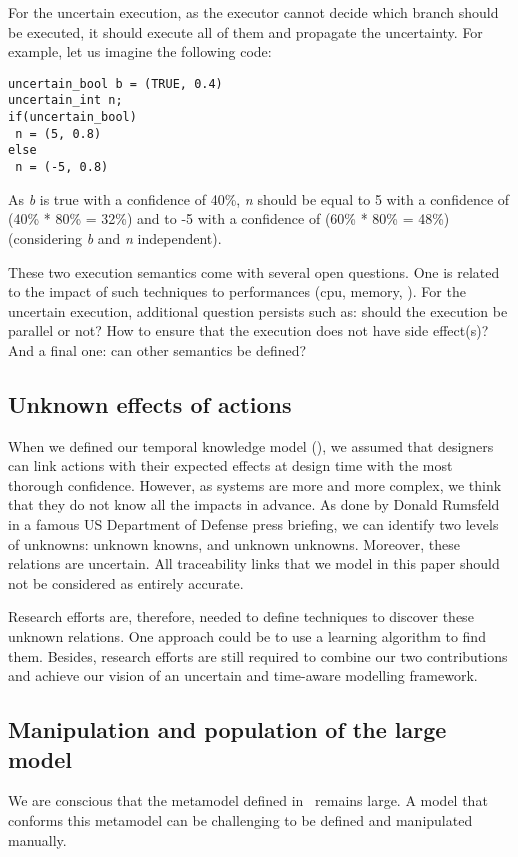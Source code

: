For the uncertain execution, as the executor cannot decide which branch should be executed, it should execute all of them and propagate the uncertainty.
For example, let us imagine the following code:

\begin{lstlisting}[style=javaStyle, caption=Example for uncertain control flow, label=lst:ucf-bool-example]
uncertain_bool b = (TRUE, 0.4)
uncertain_int n;
if(uncertain_bool)
 n = (5, 0.8)
else
 n = (-5, 0.8)
\end{lstlisting}
As \textit{b} is true with a confidence of 40\%, \textit{n} should be equal to 5 with a confidence of (40\% * 80\% = 32\%) and to -5 with a confidence of (60\% * 80\% = 48\%) (considering \textit{b} and \textit{n} independent).

These two execution semantics come with several open questions.
One is related to the impact of such techniques to performances (\gls{cpu}, memory, \etc).
For the uncertain execution, additional question persists such as: should the execution be parallel or not? How to ensure that the execution does not have side effect(s)?
And a final one: can other semantics be defined?

\subsection{Unknown effects of actions}
When we defined our temporal knowledge model (\cf {}), we assumed that designers can link \glspl{action} with their expected effects at design time with the most thorough confidence. 
However, as systems are more and more complex, we think that they do not know all the impacts in advance.
As done by Donald Rumsfeld in a famous US Department of Defense press briefing, we can identify two levels of unknowns: unknown knowns, and unknown unknowns.
Moreover, these relations are uncertain.
All traceability links that we model in this paper should not be considered as entirely accurate.

Research efforts are, therefore, needed to define techniques to discover these unknown relations.
One approach could be to use a learning algorithm to find them.
Besides, research efforts are still required to combine our two contributions and achieve our vision of an uncertain and time-aware modelling framework.

\subsection{Manipulation and population of the large model}
We are conscious that the \gls{metamodel} defined in~ remains large.
A \gls{model} that conforms this \gls{metamodel} can be challenging to be defined and manipulated manually.

